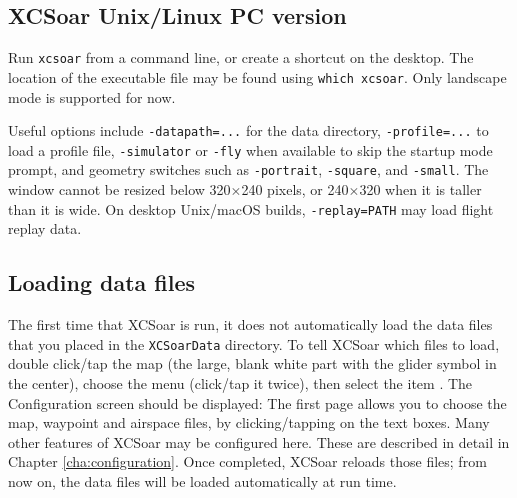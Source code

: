 \subsection*{XCSoar Unix/Linux PC version}
Run \verb|xcsoar| from a command line, or create a shortcut on the
desktop.  The location of the executable file may be found using
\verb|which xcsoar|.  Only landscape mode is  supported for now.

Useful options include \verb|-datapath=...| for the data directory,
\verb|-profile=...| to load a profile file, \verb|-simulator| or \verb|-fly|
when available to skip the startup mode prompt, and geometry switches such as
\verb|-portrait|, \verb|-square|, and \verb|-small|.
The window cannot be resized below 320$\times$240 pixels, or
240$\times$320 when it is taller than it is wide.
On desktop Unix/macOS builds, \verb|-replay=PATH| may load flight replay data.

\subsection*{Loading data files}\label{sec:loaddatafiles}
The first time that XCSoar is run, it does not automatically load the 
data files that you placed in the \verb|XCSoarData| directory.  
To tell XCSoar which files to load, double click/tap the map (the large,
blank white part with the glider symbol in the center),
choose the menu  (click/tap it twice), then select the item 
\mbox{.}  The Configuration screen should be displayed:
The first page allows you to choose the map, 
waypoint and airspace files, by clicking/tapping on the text boxes.
Many other features of XCSoar may be configured here. These are described in detail in Chapter
\ref{cha:configuration}.
Once completed, XCSoar reloads those files; from now on, the data files
will be loaded automatically at run time.

